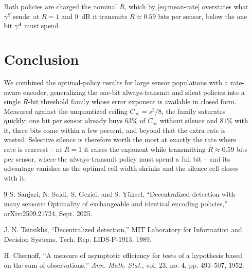 \documentclass[conference]{IEEEtran}
\begin{document}
Both policies are charged the nominal $R$, which by \eqref{eq:mean-rate}
overstates what $\gamma^S$ sends: at $R=1$ and $0$~dB it transmits
$\bar R\approx0.59$ bits per sensor, below the one bit $\gamma^A$ must
spend.

\section{Conclusion}
We combined the optimal-policy results for large sensor populations with a
rate-aware encoder, generalizing the one-bit always-transmit and silent
policies into a single $R$-bit threshold family whose error exponent is
available in closed form.  Measured against the unquantized ceiling
$C_\infty=s^2/8$, the family saturates quickly: one bit per sensor already
buys $63\%$ of $C_\infty$ without silence and $81\%$ with it, three bits
come within a few percent, and beyond that the extra rate is wasted.
Selective silence is therefore worth the most at exactly the rate where rate
is scarcest -- at $R=1$ it raises the exponent while transmitting
$\bar R\approx0.59$ bits per sensor, where the always-transmit policy must
spend a full bit -- and its advantage vanishes as the optimal cell width
shrinks and the silence cell closes with it.

\begin{thebibliography}{9}
S. Sanjari, N. Saldi, S. Gezici, and S. Y\"uksel,
``Decentralized detection with many sensors: Optimality of exchangeable
and identical encoding policies,'' arXiv:2509.21724, Sept. 2025.

J. N. Tsitsiklis, ``Decentralized detection,'' MIT Laboratory for
Information and Decision Systems, Tech. Rep. LIDS-P-1913, 1989.

H. Chernoff, ``A measure of asymptotic efficiency for tests of a
hypothesis based on the sum of observations,'' \emph{Ann. Math. Stat.},
vol. 23, no. 4, pp. 493--507, 1952.
\end{thebibliography}
\end{document}
